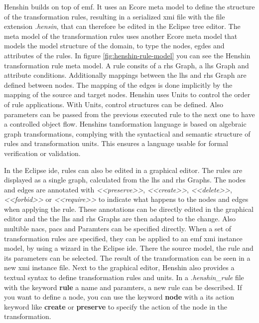 \documentclass[conference,onecolumn]{IEEEtran}
\begin{document}
  Henshin builds on top of \ac{emf}. It uses an Ecore meta model to define the structure of the transformation rules, resulting in a serialized \ac{xmi} file with the file extension \textit{.hensin}, that can therefore be edited in the Eclipse tree editor. \cite{henshin-repo} The meta model of the transformation rules uses another Ecore meta model that models the model structure of the domain, to type the nodes, egdes and attributes of the rules. \cite{henshin} In figure \ref{fig:henshin-rule-model} you can see the Henshin transformation rule meta model. A rule consits of a \ac{rhs} Graph, a \ac{lhs} Graph and attribute conditions. Additionally mappings between the \ac{lhs} and \ac{rhs} Graph are defined between nodes. The mapping of the edges is done implicitly by the mapping of the source and target nodes. \cite{henshin} Henshin uses Units to control the order of rule applications. With Units, control structures can be defined. Also parameters can be passed from the previous executed rule to the next one to have a controlled object flow. Henshins tansformation language is based on algebraic graph transformations, complying with the syntactical and semantic structure of rules and transformation units. This ensures a language usable for formal verification or validation. \cite{henshin}

  In the Eclipse \ac{ide}, rules can also be edited in a graphical editor. The rules are displayed as a single graph, calculated from the \ac{lhs} and \ac{rhs} Graphs. The nodes and edges are annotated with \textit{\textless{}\textless{}preserve\textgreater\textgreater}, \textit{\textless{}\textless{}create\textgreater\textgreater}, \textit{\textless{}\textless{}delete\textgreater\textgreater}, \textit{\textless{}\textless{}forbid\textgreater\textgreater} or \textit{\textless{}\textless{}require\textgreater\textgreater} to indicate what happens to the nodes and edges when applying the rule. These annotations can be directly edited in the graphical editor and the the \ac{lhs} and \ac{rhs} Graphs are then adapted to the change. Also multible \acp{nac}, \acp{pac} and Paramters can be specified directly. \cite{henshin-repo} When a set of transformation rules are specified, they can be applied to an \ac{emf} \ac{xmi} instance model, by using a wizard in the Eclipse \ac{ide}. There the source model, the rule and its parameters can be selected. The result of the transformation can be seen in a new \ac{xmi} instance file. \cite{henshin-repo} Next to the graphical editor, Henshin also provides a textual syntax to define transformation rules and units. In a \textit{.henshin\_rule} file with the keyword \textbf{rule} a name and paramters, a new rule can be described. If you want to define a node, you can use the keyword \textbf{node} with a its action keyword like \textbf{create} or \textbf{preserve} to specify the action of the node in the transformation. 
\end{document}
